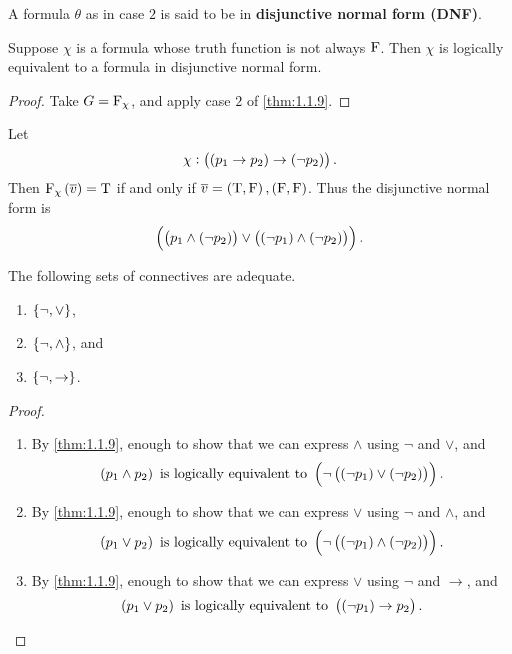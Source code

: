 A formula $ \theta $ as in case $ 2 $ is said to be in \textbf{disjunctive normal form (DNF)}.

\begin{corollary}
Suppose $ \chi $ is a formula whose truth function is not always $ \mathrm{F} $. Then $ \chi $ is logically equivalent to a formula in disjunctive normal form.
\end{corollary}

\begin{proof}
Take $ G = \mathrm{F}_\chi $, and apply case $ 2 $ of \ref{thm:1.1.9}.
\end{proof}

\begin{example*}
Let
$$ \chi : \impb{\impb{p_1}{p_2}}{\notb{p_2}}. $$
Then $ \F_\chi\br{\overline{v}} = \T $ if and only if $ \overline{v} = \br{\T, \F}, \br{\F, \F} $. Thus the disjunctive normal form is
$$ \orb{\andb{p_1}{\notb{p_2}}}{\andb{\notb{p_1}}{\notb{p_2}}}. $$
\end{example*}

\begin{corollary}
The following sets of connectives are adequate.
\begin{enumerate}
\item $ \cbr{\neg, \lor} $,
\item $ \cbr{\neg, \land} $, and
\item $ \cbr{\neg, \rightarrow} $.
\end{enumerate}
\end{corollary}

\begin{proof}
\hfill
\begin{enumerate}
\item By \ref{thm:1.1.9}, enough to show that we can express $ \land $ using $ \neg $ and $ \lor $, and
$$ \andb{p_1}{p_2} \ \text{is logically equivalent to} \ \notb{\orb{\notb{p_1}}{\notb{p_2}}}. $$
\item By \ref{thm:1.1.9}, enough to show that we can express $ \lor $ using $ \neg $ and $ \land $, and
$$ \orb{p_1}{p_2} \ \text{is logically equivalent to} \ \notb{\andb{\notb{p_1}}{\notb{p_2}}}. $$
\item By \ref{thm:1.1.9}, enough to show that we can express $ \lor $ using $ \neg $ and $ \rightarrow $, and
$$ \orb{p_1}{p_2} \ \text{is logically equivalent to} \ \impb{\notb{p_1}}{p_2}. $$
\end{enumerate}
\end{proof}

\pagebreak

